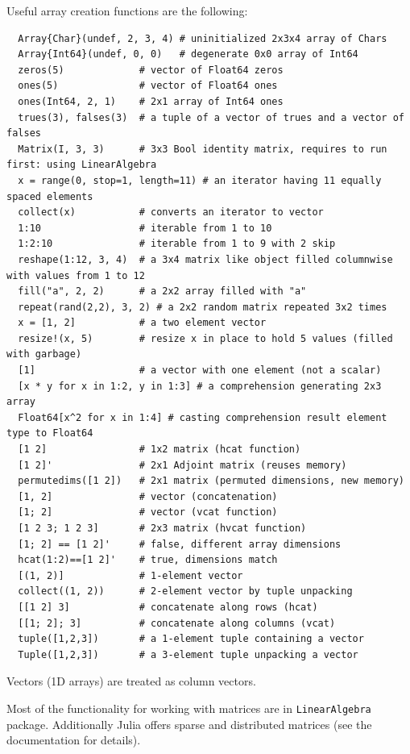 \documentclass[10pt,a4paper]{article}
\begin{document}
Useful array creation functions are the following:
\begin{lstlisting}
  Array{Char}(undef, 2, 3, 4) # uninitialized 2x3x4 array of Chars
  Array{Int64}(undef, 0, 0)   # degenerate 0x0 array of Int64
  zeros(5)             # vector of Float64 zeros
  ones(5)              # vector of Float64 ones
  ones(Int64, 2, 1)    # 2x1 array of Int64 ones
  trues(3), falses(3)  # a tuple of a vector of trues and a vector of falses
  Matrix(I, 3, 3)      # 3x3 Bool identity matrix, requires to run first: using LinearAlgebra
  x = range(0, stop=1, length=11) # an iterator having 11 equally spaced elements
  collect(x)           # converts an iterator to vector
  1:10                 # iterable from 1 to 10
  1:2:10               # iterable from 1 to 9 with 2 skip
  reshape(1:12, 3, 4)  # a 3x4 matrix like object filled columnwise with values from 1 to 12
  fill("a", 2, 2)      # a 2x2 array filled with "a"
  repeat(rand(2,2), 3, 2) # a 2x2 random matrix repeated 3x2 times
  x = [1, 2]           # a two element vector
  resize!(x, 5)        # resize x in place to hold 5 values (filled with garbage)
  [1]                  # a vector with one element (not a scalar)
  [x * y for x in 1:2, y in 1:3] # a comprehension generating 2x3 array
  Float64[x^2 for x in 1:4] # casting comprehension result element type to Float64
  [1 2]                # 1x2 matrix (hcat function)
  [1 2]'               # 2x1 Adjoint matrix (reuses memory)
  permutedims([1 2])   # 2x1 matrix (permuted dimensions, new memory)
  [1, 2]               # vector (concatenation)
  [1; 2]               # vector (vcat function)
  [1 2 3; 1 2 3]       # 2x3 matrix (hvcat function)
  [1; 2] == [1 2]'     # false, different array dimensions
  hcat(1:2)==[1 2]'    # true, dimensions match
  [(1, 2)]             # 1-element vector
  collect((1, 2))      # 2-element vector by tuple unpacking
  [[1 2] 3]            # concatenate along rows (hcat)
  [[1; 2]; 3]          # concatenate along columns (vcat)
  tuple([1,2,3])       # a 1-element tuple containing a vector
  Tuple([1,2,3])       # a 3-element tuple unpacking a vector
\end{lstlisting}
Vectors (1D arrays) are treated as column vectors.

Most of the functionality for working with matrices are in
\lstinline|LinearAlgebra| package. Additionally Julia offers sparse and
distributed matrices (see the documentation for details).
\end{document}
